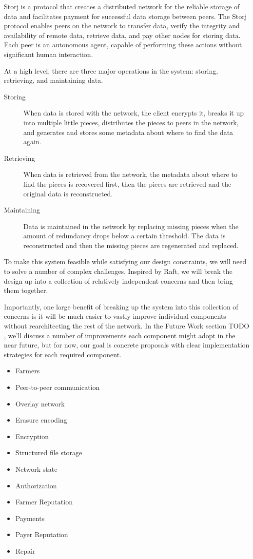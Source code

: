 \documentclass[a4paper,10pt]{article}
\newcommand{\todo}[1]{{\color{red} TODO #1}}
\begin{document}
Storj is a protocol that creates a distributed network for the reliable storage
of data and facilitates payment for successful data storage between peers. The
Storj protocol enables peers on the network to transfer data, verify the
integrity and availability of remote data, retrieve data, and pay other nodes
for storing data.
Each peer is an autonomous agent, capable of performing these actions without
significant human interaction.

At a high level, there are three major operations in the system: storing,
retrieving, and maintaining data.

\begin{description}

\item[Storing]
When data is stored with the network, the client encrypts it, breaks it up into
multiple little pieces, distributes the pieces to peers in the network, and
generates and stores some metadata about where to find the data again.

\item[Retrieving]
When data is retrieved from the network, the metadata about where to find the
pieces is recovered first, then the pieces are retrieved and the original data
is reconstructed.

\item[Maintaining]
Data is maintained in the network by replacing missing pieces when the amount
of redundancy drops below a certain threshold. The data is reconstructed and
then the missing pieces are regenerated and replaced.

\end{description}

To make this system feasible while satisfying our design constraints, we will
need to solve a number of complex challenges. Inspired by Raft\cite{raft}, we
will break the design up into a collection of relatively independent concerns
and then bring them together.

Importantly, one large benefit of breaking up
the system into this collection of concerns is it will be much easier to
vastly improve individual components without rearchitecting the rest of the
network. In the Future Work section \todo{}, we'll discuss a number of
improvements each component might adopt in the near future, but for now, our
goal is concrete proposals with clear implementation strategies for each
required component.

\begin{itemize}
\item Farmers
\item Peer-to-peer communication
\item Overlay network
\item Erasure encoding
\item Encryption
\item Structured file storage
\item Network state
\item Authorization
\item Farmer Reputation
\item Payments
\item Payer Reputation
\item Repair
\end{itemize}
\end{document}
